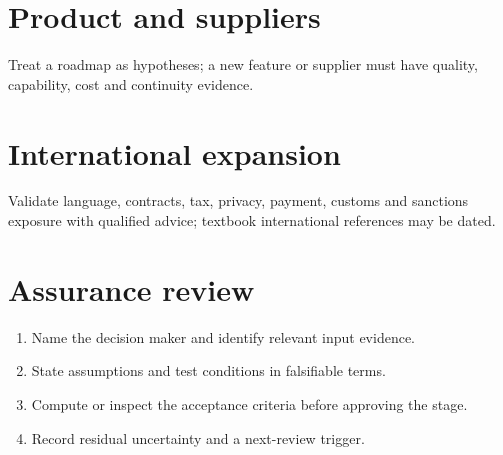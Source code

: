 \documentclass[11pt]{article}
\begin{document}
\section{Product and suppliers}
Treat a roadmap as hypotheses; a new feature or supplier must have quality, capability, cost and continuity evidence.
\section{International expansion}
Validate language, contracts, tax, privacy, payment, customs and sanctions exposure with qualified advice; textbook international references may be dated.
\section{Assurance review}
\begin{enumerate}[leftmargin=*,itemsep=5pt]
\item Name the decision maker and identify relevant input evidence.
\item State assumptions and test conditions in falsifiable terms.
\item Compute or inspect the acceptance criteria before approving the stage.
\item Record residual uncertainty and a next-review trigger.
\end{enumerate}
\end{document}
